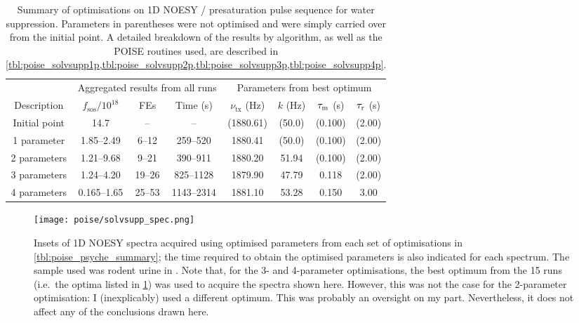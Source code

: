 \begin{table}
    \centering
    \begin{tabular}{cccccccc}
        \toprule
         & \multicolumn{3}{c}{Aggregated results from all runs} & \multicolumn{4}{c}{Parameters from best optimum} \\
        Description & $f_\mathrm{sos} / 10^{18}$ & FEs & Time (\si{\s}) & $\nu_\text{tx}$ (\si{\Hz}) & $k$ (\si{\Hz}) & $\tau_\mathrm{m}$ (\si{\s}) & $\tau_\mathrm{r}$ (\si{\s}) \\
        \hline
        Initial point & 14.7         & --     & --         & (1880.61) & (50.0) & (0.100) & (2.00) \\
        1 parameter   & 1.85--2.49   & 6--12  & 259--520   & 1880.41   & (50.0) & (0.100) & (2.00) \\
        2 parameters  & 1.21--9.68   & 9--21  & 390--911   & 1880.20   & 51.94  & (0.100) & (2.00) \\
        3 parameters  & 1.24--4.20   & 19--26 & 825--1128  & 1879.90   & 47.79  & 0.118   & (2.00) \\
        4 parameters  & 0.165--1.65  & 25--53 & 1143--2314 & 1881.10   & 53.28  & 0.150   & 3.00 \\
        \hline
    \end{tabular}
    \caption[Overview of all water suppression optimisations]{
        Summary of optimisations on 1D NOESY / presaturation pulse sequence for water suppression.
        Parameters in parentheses were not optimised and were simply carried over from the initial point.
        A detailed breakdown of the results by algorithm, as well as the POISE routines used, are described in \cref{tbl:poise_solvsupp1p,tbl:poise_solvsupp2p,tbl:poise_solvsupp3p,tbl:poise_solvsupp4p}.
    }
    \label{tbl:poise_solvsupp_summary}
\end{table}

\begin{figure}[htb]
    \centering
    \texttt{[image: poise/solvsupp\_spec.png]}
    \caption[1D NOESY spectra of rodent urine sample before and after optimisation]{
        Insets of 1D NOESY spectra acquired using optimised parameters from each set of optimisations in \cref{tbl:poise_psyche_summary}; the time required to obtain the optimised parameters is also indicated for each spectrum.
        The sample used was rodent urine in .
        Note that, for the 3- and 4-parameter optimisations, the best optimum from the 15 runs (i.e.\ the optima listed in \cref{tbl:poise_solvsupp_summary}) was used to acquire the spectra shown here.
        However, this was not the case for the 2-parameter optimisation: I (inexplicably) used a different optimum.
        This was probably an oversight on my part.
        Nevertheless, it does not affect any of the conclusions drawn here.
    } \label{fig:poise_solvsupp_spec}
\end{figure}

